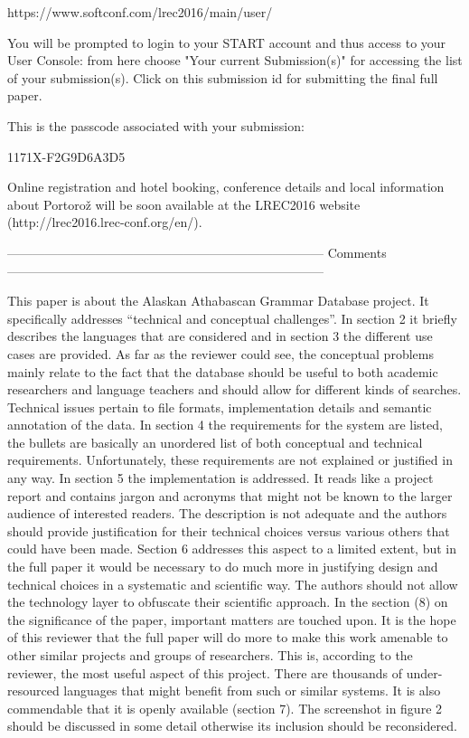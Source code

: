 \documentclass[10pt, a4paper]{article}
\begin{document}
    https://www.softconf.com/lrec2016/main/user/

You will be prompted to login to your START account and thus access to your User Console: from here choose "Your current Submission(s)" for accessing the list of your submission(s). Click on this submission id for submitting the final full paper.

This is the passcode associated with your submission:

			  1171X-F2G9D6A3D5
 
Online registration and hotel booking, conference details and local information about Portorož will be soon available at the LREC2016 website (http://lrec2016.lrec-conf.org/en/).
 
 
 

---------------------------------------------------------------------------
Comments
---------------------------------------------------------------------------

This paper is about the Alaskan Athabascan Grammar Database project. It
specifically addresses “technical and conceptual challenges”. In section 2
it briefly describes the languages that are considered and in section 3 the
different use cases are provided. As far as the reviewer could see, the
conceptual problems mainly relate to the fact that the database should be
useful to both academic researchers and language teachers and should allow for
different kinds of searches. Technical issues pertain to file formats,
implementation details and semantic annotation of the data. In section 4 the
requirements for the system are listed, the bullets are basically an unordered
list of both conceptual and technical requirements. Unfortunately, these
requirements are not explained or justified in any way. In section 5 the
implementation is addressed. It reads like a project report and contains jargon
and acronyms that might not be known to the larger audience of interested
readers. The description is not adequate and the authors should provide
justification for their technical choices versus various others that could have
been made. Section 6 addresses this aspect to a limited extent, but in the full
paper it would be necessary to do much more in justifying design and technical
choices in a systematic and scientific way. The authors should not allow the
technology layer to obfuscate their scientific approach. In the section (8) on
the significance of the paper, important matters are touched upon. It is the
hope of this reviewer that the full paper will do more to make this work
amenable to other similar projects and groups of researchers. This is,
according to the reviewer, the most useful aspect of this project. There are
thousands of under-resourced languages that might benefit from such or similar
systems. It is also commendable that it is openly available (section 7). The
screenshot in figure 2 should be discussed in some detail otherwise its
inclusion should be reconsidered. 
\end{document}
